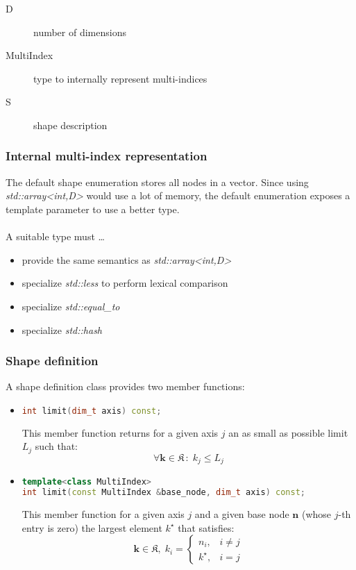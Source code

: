 \documentclass{article}
\begin{document}
\begin{description}
\item[D] number of dimensions
\item[MultiIndex] type to internally represent multi-indices
\item[S] shape description
\end{description}

\subsubsection{Internal multi-index representation}
The default shape enumeration stores all nodes in a vector. Since using \emph{std::array\textless int,D\textgreater} would use a lot of memory, the default enumeration exposes a template parameter to use a better type. \\ \\ A suitable type must \dots
\begin{itemize}
\item provide the same semantics as \emph{std::array\textless int,D\textgreater}
\item specialize \emph{std::less} to perform lexical comparison
\item specialize \emph{std::equal\_to}
\item specialize \emph{std::hash}
\end{itemize}

\subsubsection{Shape definition}
A shape definition class provides two member functions:

\begin{itemize}
\item
\begin{lstlisting}[language=C++, caption={}]
int limit(dim_t axis) const;
\end{lstlisting}
This member function returns for a given axis \( j \) an as small as possible limit \( L_j \) such that:
\[ \forall \boldsymbol{k} \in \mathfrak{K} \,\colon\; k_j \leq L_j \]

\item
\begin{lstlisting}[language=C++, caption={}]
template<class MultiIndex>
int limit(const MultiIndex &base_node, dim_t axis) const;
\end{lstlisting}
This member function for a given axis \( j \) and a given base node \( \boldsymbol{n} \) (whose \( j \)-th entry is zero)
the largest element \( k^\star \) that satisfies: 
\[ \boldsymbol{k} \in \mathfrak{K}, \;
k_i =
   \begin{cases}
      n_i,& i \neq j\\
      k^\star, & i = j
   \end{cases}
\]

\end{itemize}
\end{document}

